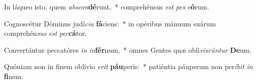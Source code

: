 \item In láqueo isto, quem \textit{abs}\textit{con}\textbf{dé}runt,~* comprehénsus \textit{est} \textit{pes} \textit{e}\textbf{ó}rum.
\item Cognoscétur Dóminus judí\textit{ci}\textit{a} \textbf{fá}ciens:~* in opéribus mánuum suárum comprehén\textit{sus} \textit{est} \textit{pec}\textbf{cá}tor.
\item Convertántur peccatóres \textit{in} \textit{in}\textbf{fér}num,~* omnes Gentes quæ obli\textit{vis}\textit{cún}\textit{tur} \textbf{De}um.
\item Quóniam non in finem oblívio \textit{e}\textit{rit} \textbf{páu}peris:~* patiéntia páuperum non per\textit{í}\textit{bit} \textit{in} \textbf{fi}nem.
